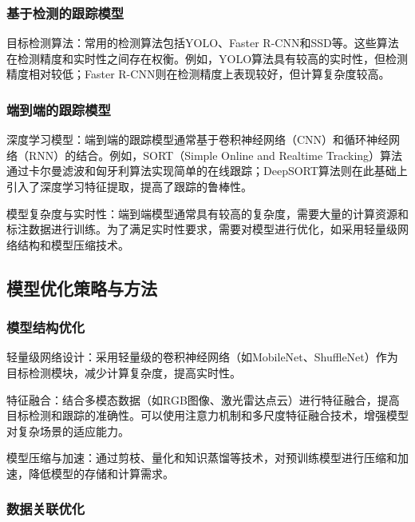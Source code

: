 \subsubsection{基于检测的跟踪模型}

目标检测算法：常用的检测算法包括YOLO、Faster R-CNN和SSD等。这些算法在检测精度和实时性之间存在权衡。例如，YOLO算法具有较高的实时性，但检测精度相对较低；Faster R-CNN则在检测精度上表现较好，但计算复杂度较高\cite{梁浩涛 2024 基于数字孪生的自动驾驶仿真测试场景分类与生成关键技术研究及验证}。



\subsubsection{端到端的跟踪模型}


深度学习模型：端到端的跟踪模型通常基于卷积神经网络（CNN）和循环神经网络（RNN）的结合。例如，SORT（Simple Online and Realtime Tracking）算法通过卡尔曼滤波和匈牙利算法实现简单的在线跟踪；DeepSORT算法则在此基础上引入了深度学习特征提取，提高了跟踪的鲁棒性\cite{何东 2024 面向自动驾驶仿真测试的场景生成与泛化技术研究}。

模型复杂度与实时性：端到端模型通常具有较高的复杂度，需要大量的计算资源和标注数据进行训练。为了满足实时性要求，需要对模型进行优化，如采用轻量级网络结构和模型压缩技术\cite{黄玉琅 2025 车联网技术在汽车自动驾驶技术上的应用探微}。

\subsection{模型优化策略与方法}

\subsubsection{模型结构优化}

轻量级网络设计：采用轻量级的卷积神经网络（如MobileNet、ShuffleNet）作为目标检测模块，减少计算复杂度，提高实时性。

特征融合：结合多模态数据（如RGB图像、激光雷达点云）进行特征融合，提高目标检测和跟踪的准确性。可以使用注意力机制和多尺度特征融合技术，增强模型对复杂场景的适应能力\cite{马琨 2025 从代表委员建言,看智能驾驶如何落地}。

模型压缩与加速：通过剪枝、量化和知识蒸馏等技术，对预训练模型进行压缩和加速，降低模型的存储和计算需求\cite{阳静 2024 快速路入口匝道自主换道控制研究}。

\subsubsection{数据关联优化}

